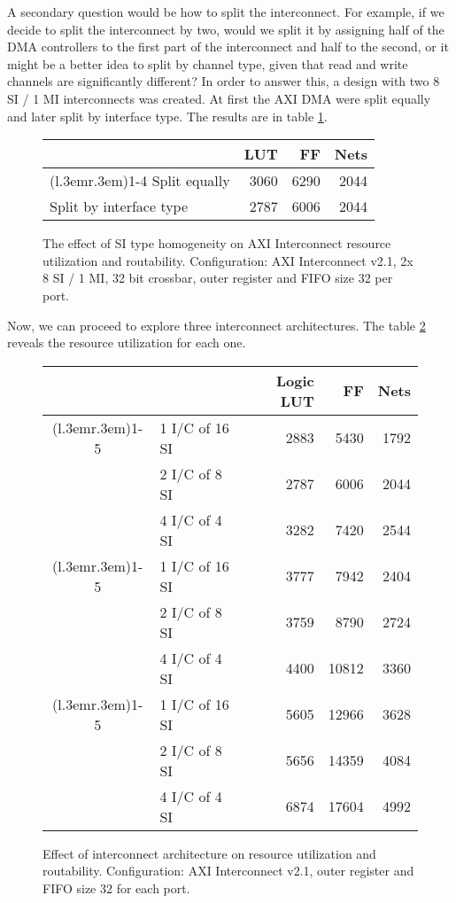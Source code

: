 A secondary question would be how to split the interconnect.
For example, if we decide to split the interconnect by two,
would we split it by assigning half of the DMA controllers to the first
part of the interconnect and half to the second, or it might be a better idea to split by
channel type, given that read and write channels are significantly different?
In order to answer this, a design with two 8 SI / 1 MI interconnects was created.
At first the AXI DMA were split equally and later split by interface type.
The results are in table \ref{tab:int-mixed}.

\begin{figure}[ht!]
\centering
\begin{tabular}{lrrr}
\toprule
			& LUT	& FF	& Nets \\
\cmidrule(l{.3em}r{.3em}){1-4}
Split equally 		& 3060	&6290	&2044 	\\
Split by interface type	& 2787	&6006	& 2044	\\
\bottomrule
\end{tabular}
\caption{The effect of SI type homogeneity on AXI Interconnect resource utilization and routability.
	Configuration: AXI Interconnect v2.1, 2x 8 SI / 1 MI, 32 bit crossbar,
	outer register and FIFO size 32 per port.}
\label{tab:int-mixed}
\end{figure}

Now, we can proceed to explore three interconnect architectures.
The table \ref{tab:int-msi} reveals the resource utilization for each one.

\begin{figure}[ht!]
\centering
\begin{tabular}{cl rrr}
\toprule
&		&Logic LUT & FF	& Nets \\
\cmidrule(l{.3em}r{.3em}){1-5}
\multirow{3}{*}{\rotatebox{90}{32 bit}}
&1 I/C of 16 SI	& 2883	& 5430	& 1792 	\\
&2 I/C of 8 SI	& 2787	& 6006	& 2044	\\
&4 I/C of 4 SI	& 3282	& 7420	& 2544	\\
\cmidrule(l{.3em}r{.3em}){1-5}
\multirow{3}{*}{\rotatebox{90}{64 bit}}
&1 I/C of 16 SI	& 3777	& 7942 	& 2404	\\
&2 I/C of 8 SI	& 3759	& 8790	& 2724	\\
&4 I/C of 4 SI	& 4400	&10812	& 3360	\\
\cmidrule(l{.3em}r{.3em}){1-5}
\multirow{3}{*}{\rotatebox{90}{128 bit}}
&1 I/C of 16 SI	& 5605	& 12966	& 3628	\\
&2 I/C of 8 SI	& 5656	& 14359	& 4084	\\
&4 I/C of 4 SI	& 6874	& 17604	& 4992	\\
\bottomrule
\end{tabular}
\caption{Effect of interconnect architecture on resource utilization and routability.
	Configuration: AXI Interconnect v2.1, outer register and FIFO size 32 for each port.}
\label{tab:int-msi}
\end{figure}

